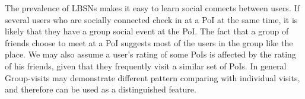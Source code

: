  The prevalence of LBSNs makes it easy to learn social connects between users. If several users who are socially connected check in at a PoI at the same time, it is likely that they have a group social event at the PoI. The fact that a group of friends choose to meet at a PoI suggests most of the users in the group like the place. We may also assume a user's rating of some PoIs is affected by the rating of his friends, given that they frequently visit a similar set of PoIs. In general Group-visits may demonstrate different pattern comparing with individual visits, and therefore can be used as a distinguished feature. 
